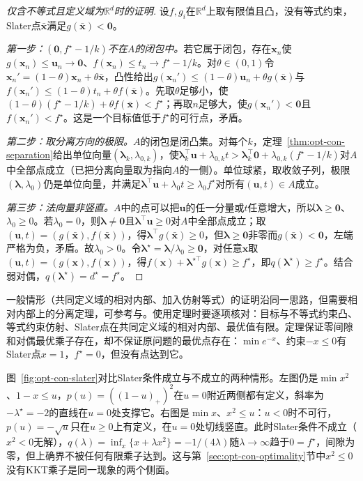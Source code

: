 \begin{proof}[仅含不等式且定义域为$\mathbb R^d$时的证明]
设$f,g_i$在$\mathbb R^d$上取有限值且凸，没有等式约束，Slater点$\bar{\bm x}$满足$g(\bar{\bm x})<\bm0$。

\emph{第一步：$(\bm0,f^\star-1/k)$不在$A$的闭包中。}若它属于闭包，存在$\bm x_n$使$g(\bm x_n)\leq\bm u_n\to\bm0$、$f(\bm x_n)\leq t_n\to f^\star-1/k$。对$\theta\in(0,1)$令$\bm x_n'=(1-\theta)\bm x_n+\theta\bar{\bm x}$，凸性给出$g(\bm x_n')\leq(1-\theta)\bm u_n+\theta g(\bar{\bm x})$与$f(\bm x_n')\leq(1-\theta)t_n+\theta f(\bar{\bm x})$。先取$\theta$足够小，使$(1-\theta)(f^\star-1/k)+\theta f(\bar{\bm x})<f^\star$；再取$n$足够大，使$g(\bm x_n')<\bm0$且$f(\bm x_n')<f^\star$。这是一个目标值低于$f^\star$的可行点，矛盾。

\emph{第二步：取分离方向的极限。}$A$的闭包是闭凸集。对每个$k$，定理~\ref{thm:opt-con-separation}给出单位向量$(\bm\lambda_k,\lambda_{0,k})$，使$\bm\lambda_k^\top\bm u+\lambda_{0,k}t>\bm\lambda_k^\top\bm0+\lambda_{0,k}(f^\star-1/k)$对$A$中全部点成立（已把分离向量取为指向$A$的一侧）。单位球紧，取收敛子列，极限$(\bm\lambda,\lambda_0)$仍是单位向量，并满足$\bm\lambda^\top\bm u+\lambda_0t\geq\lambda_0f^\star$对所有$(\bm u,t)\in A$成立。

\emph{第三步：法向量非竖直。}$A$中的点可以把$\bm u$的任一分量或$t$任意增大，所以$\bm\lambda\geq\bm0$、$\lambda_0\geq0$。若$\lambda_0=0$，则$\bm\lambda\neq\bm0$且$\bm\lambda^\top\bm u\geq0$对$A$中全部点成立；取$(\bm u,t)=(g(\bar{\bm x}),f(\bar{\bm x}))$，得$\bm\lambda^\top g(\bar{\bm x})\geq0$，但$\bm\lambda\geq\bm0$非零而$g(\bar{\bm x})<\bm0$，左端严格为负，矛盾。故$\lambda_0>0$。令$\bm\lambda^\star=\bm\lambda/\lambda_0\geq\bm0$，对任意$\bm x$取$(\bm u,t)=(g(\bm x),f(\bm x))$，得$f(\bm x)+\bm\lambda^{\star\top}g(\bm x)\geq f^\star$，即$q(\bm\lambda^\star)\geq f^\star$。结合弱对偶，$q(\bm\lambda^\star)=d^\star=f^\star$。
\end{proof}

一般情形（共同定义域的相对内部、加入仿射等式）的证明沿同一思路，但需要相对内部上的分离定理，可参考与。使用定理时要逐项核对：目标与不等式约束凸、等式约束仿射、Slater点在共同定义域的相对内部、最优值有限。定理保证零间隙和对偶最优乘子存在，却不保证原问题的最优点存在：$\min e^{-x}$、约束$-x\leq0$有Slater点$x=1$，$f^\star=0$，但没有点达到它。

图~\ref{fig:opt-con-slater}对比Slater条件成立与不成立的两种情形。左图仍是$\min x^2$、$1-x\leq u$，$p(u)=((1-u)_+)^2$在$u=0$附近两侧都有定义，斜率为$-\lambda^\star=-2$的直线在$u=0$处支撑它。右图是$\min x$、$x^2\leq u$：$u<0$时不可行，$p(u)=-\sqrt u$只在$u\geq0$上有定义，在$u=0$处切线竖直。此时Slater条件不成立（$x^2<0$无解），$q(\lambda)=\inf_x\{x+\lambda x^2\}=-1/(4\lambda)$随$\lambda\to\infty$趋于$0=f^\star$，间隙为零，但上确界不被任何有限乘子达到。这与第~\ref{sec:opt-con-optimality}节中$x^2\leq0$没有KKT乘子是同一现象的两个侧面。

